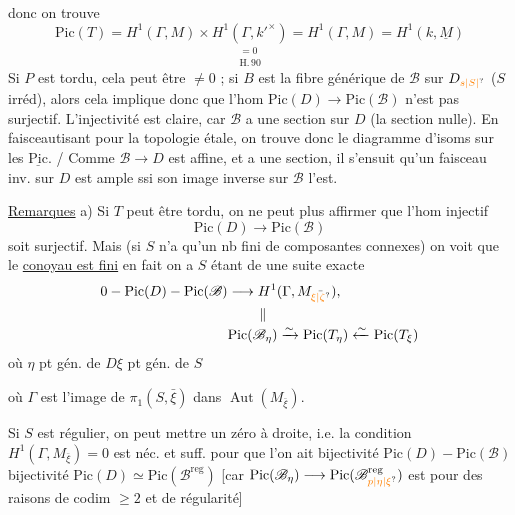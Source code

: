 donc on trouve
\[
\mathrm{Pic}(T)=H^1(\Gamma,M)\times\underset{\substack{=0\\\mathrm{H.}\,90}}{H^1(\Gamma,k'^{\times})}=H^1(\Gamma,M)=H^1(k,\underline M)
\]
Si $P$ est tordu, cela peut être $\ne 0$ ; si $B$ est la fibre générique de $\mathscr B$ sur $D_{\unsure{s|S|{}}}$ ($S$ irréd), alors cela implique donc que l'hom $\mathrm{Pic}(D)\longrightarrow\mathrm{Pic}(\mathscr B)$ n'est pas surjectif. L'injectivité est claire, car $\mathscr B$ a une section sur $D$ (la section nulle). En faisceautisant pour la topologie étale, on trouve donc le diagramme d'isoms sur les $\underline{\mathrm{Pic}}$. / Comme $\mathscr B\longrightarrow D$ est affine, et a une section, il s'ensuit qu'un faisceau inv. sur $D$ est ample ssi son image inverse sur $\mathscr B$ l'est.

\uline{Remarques} a) Si $T$ peut être tordu, on ne peut plus affirmer que l'hom injectif
\[
\mathrm{Pic}(D)\longrightarrow\mathrm{Pic}(\mathscr B)
\]
soit surjectif. Mais (si $S$  n'a qu'un nb fini de composantes connexes) on voit que le \uline{conoyau est fini} en fait on a  $S$ étant de  une suite exacte
\[
\begin{aligned}
0-\mathrm{Pic}(D)-\mathrm{Pic}(\mathscr B)&\longrightarrow H^1(\Gamma,M_{\bar{\unsure{\xi|\zeta}}}),\\[-1pt]
&\hspace{8mm}\Vert\\[-2pt]
&\mathrm{Pic}(\mathscr B_\eta)\xrightarrow{\sim}\mathrm{Pic}(T_\eta)\xleftarrow{\sim}\mathrm{Pic}(T_\xi)
\end{aligned}
\]
où $\eta$ pt gén. de $D$\quad $\xi$ pt gén. de $S$

 où $\Gamma$ est l'image de $\pi_1(S,\bar\xi)$ dans $\operatorname{Aut}(M_{\bar\xi})$.

Si $S$ est régulier,  on peut mettre un zéro à droite, i.e. la condition $H^1(\Gamma,M_{\bar\xi})=0$ est néc. et suff. pour que l'on ait bijectivité $\mathrm{Pic}(D)-\mathrm{Pic}(\mathscr B)$   bijectivité $\mathrm{Pic}(D)\simeq\mathrm{Pic}(\mathscr B^{\mathrm{reg}})$ [car $\mathrm{Pic}(\mathscr B_\eta)\longrightarrow\mathrm{Pic}(\mathscr B_{\unsure{p|\eta|\xi}}^{\mathrm{reg}})$ est   pour des raisons de codim $\geq 2$ et de régularité]

